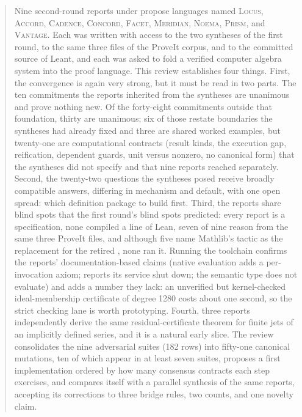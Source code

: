 \documentclass[11pt,a4paper]{article}
\newcommand{\code}[1]{\texttt{\detokenize{#1}}}
\newcommand{\Lc}{\textsc{Locus}}
\newcommand{\Ac}{\textsc{Accord}}
\newcommand{\Cd}{\textsc{Cadence}}
\newcommand{\Cc}{\textsc{Concord}}
\newcommand{\Fc}{\textsc{Facet}}
\newcommand{\Md}{\textsc{Meridian}}
\newcommand{\Nm}{\textsc{Noema}}
\newcommand{\Pm}{\textsc{Prism}}
\newcommand{\Vt}{\textsc{Vantage}}
\theoremstyle{definition}
\begin{document}
\begin{abstract}
\noindent Nine second-round reports under \code{docs/round-2/ideas} propose languages named \Lc, \Ac, \Cd, \Cc, \Fc, \Md, \Nm, \Pm, and \Vt. Each was written with access to the two syntheses of the first round, to the same three files of the ProveIt corpus, and to the committed source of Leant, and each was asked to fold a verified computer algebra system into the proof language. This review establishes four things. First, the convergence is again very strong, but it must be read in two parts. The ten commitments the reports inherited from the syntheses are unanimous and prove nothing new. Of the forty-eight commitments outside that foundation, thirty are unanimous; six of those restate boundaries the syntheses had already fixed and three are shared worked examples, but twenty-one are computational contracts (result kinds, the execution gap, reification, dependent guards, unit versus nonzero, no canonical form) that the syntheses did not specify and that nine reports reached separately. Second, the twenty-two questions the syntheses posed receive broadly compatible answers, differing in mechanism and default, with one open spread: which definition package to build first. Third, the reports share blind spots that the first round's blind spots predicted: every report is a specification, none compiled a line of Lean, seven of nine reason from the same three ProveIt files, and although five name Mathlib's \code{grobner} tactic as the replacement for the retired \code{polyrith}, none ran it. Running the toolchain confirms the reports' documentation-based claims (native evaluation adds a per-invocation axiom; \code{polyrith} reports its service shut down; the semantic \code{Polynomial} type does not evaluate) and adds a number they lack: an unverified but kernel-checked ideal-membership certificate of degree 1280 costs about one second, so the strict checking lane is worth prototyping. Fourth, three reports independently derive the same residual-certificate theorem for finite jets of an implicitly defined series, and it is a natural early slice. The review consolidates the nine adversarial suites (182 rows) into fifty-one canonical mutations, ten of which appear in at least seven suites, proposes a first implementation ordered by how many consensus contracts each step exercises, and compares itself with a parallel synthesis of the same reports, accepting its corrections to three bridge rules, two counts, and one novelty claim.
\end{abstract}

\begingroup
\small
\tableofcontents
\endgroup
\clearpage
\end{document}
